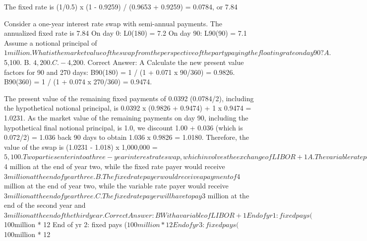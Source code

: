 \documentclass[12pt,a4paper]{exam}
\begin{document}
\begin{questions}
The fixed rate is (1/0.5) x (1 - 0.9259) / (0.9653 + 0.9259) = 0.0784, or 7.84%

Consider a one-year interest rate swap with semi-annual payments. The annualized fixed rate is 7.84%
On day 0: L0(180) = 7.2%
On day 90: L90(90) = 7.1%
Assume a notional principal of $1 million. What is the market value of the swap from the perspective of the party paying the floating rate on day 90?
A. $5,100.
B. $4,200.
C. -$4,200.
Correct Answer: A
Calculate the new present value factors for 90 and 270 days:
B90(180) = 1 / (1 + 0.071 x 90/360) = 0.9826.
B90(360) = 1 / (1 + 0.074 x 270/360) = 0.9474.

The present value of the remaining fixed payments of 0.0392 (0.0784/2), including the hypothetical notional principal, is 0.0392 x (0.9826 + 0.9474) + 1 x 0.9474 = 1.0231.
As the market value of the remaining payments on day 90, including the hypothetical final notional principal, is 1.0, we discount 1.00 + 0.036 (which is 0.072/2) = 1.036 back 90 days to obtain 1.036 x 0.9826 = 1.0180.
Therefore, the value of the swap is (1.0231 - 1.018) x 1,000,000 = $5,100.

Two parties enter into a three-year interest rate swap, which involves the exchange of LIBOR+1%
A. The variable rate payer would receive a payment of $4 million at the end of year two, while the fixed rate payer would receive $3 million at the end of year three.
B. The fixed rate payer would receive a payment of $4 million at the end of year two, while the variable rate payer would receive $3 million at the end of year three.
C. The fixed rate payer will have to pay $3 million at the end of the second year and $3 million at the end of the third year.
Correct Answer: B
With a variable of LIBOR + 1%

End of yr 1: fixed pays ($100million * 12%
End of yr 2: fixed pays ($100million * 12%
End of yr 3: fixed pays ($100million * 12%



\end{questions}
\end{document}
